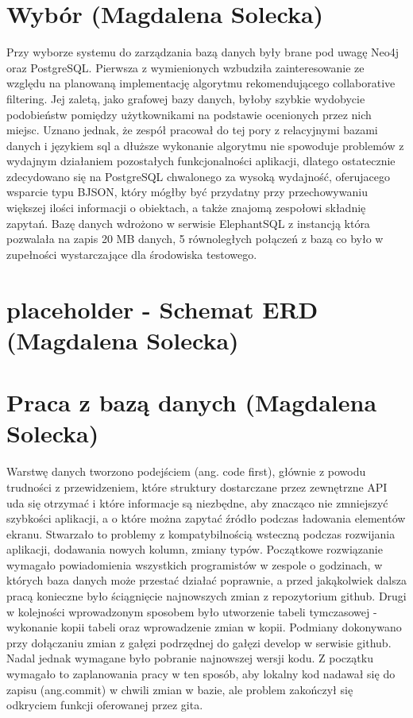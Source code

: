 \documentclass[10pt,twoside,a4paper]{report}
\begin{document}
\section{Wybór (Magdalena Solecka)}
\par Przy wyborze systemu do zarządzania bazą danych były brane pod uwagę Neo4j oraz PostgreSQL. Pierwsza z wymienionych wzbudziła zainteresowanie ze względu na planowaną implementację algorytmu rekomendującego collaborative filtering. Jej zaletą, jako grafowej bazy danych, byłoby szybkie wydobycie podobieństw pomiędzy użytkownikami na podstawie ocenionych przez nich miejsc. Uznano jednak, że zespół pracował do tej pory z relacyjnymi bazami danych i językiem sql a dłuższe wykonanie algorytmu nie spowoduje problemów z wydajnym działaniem pozostałych funkcjonalności aplikacji, dlatego ostatecznie zdecydowano się na PostgreSQL chwalonego za wysoką wydajność, oferujacego wsparcie typu BJSON, który mógłby być przydatny przy  przechowywaniu większej ilości informacji o obiektach, a także znajomą zespołowi składnię zapytań. Bazę danych wdrożono w serwisie ElephantSQL z instancją \cite{tiny turtle}
 która pozwalała na zapis 20 MB danych, 5 równoległych połączeń z bazą co było w zupełności wystarczające dla środowiska testowego.

\section{placeholder - Schemat ERD (Magdalena Solecka)}

\section{Praca z bazą danych (Magdalena Solecka)}
\par Warstwę danych tworzono podejściem \cite{najpierw kod} (ang. code first), głównie z powodu trudności z przewidzeniem, które struktury dostarczane przez zewnętrzne API uda się otrzymać i które informacje są niezbędne, aby znacząco nie zmniejszyć szybkości aplikacji, a o które można zapytać źródło podczas ładowania elementów ekranu. Stwarzało to problemy z kompatybilnością wsteczną podczas rozwijania aplikacji, dodawania nowych kolumn, zmiany typów. Początkowe rozwiązanie wymagało powiadomienia wszystkich programistów w zespole o godzinach, w których baza danych może przestać działać poprawnie, a przed jakąkolwiek dalsza pracą konieczne było ściągnięcie najnowszych zmian z repozytorium github. Drugi w kolejności wprowadzonym sposobem było utworzenie tabeli tymczasowej - wykonanie kopii tabeli oraz wprowadzenie zmian w kopii. Podmiany dokonywano przy dołączaniu zmian z gałęzi podrzędnej do gałęzi develop w serwisie github. Nadal jednak wymagane było pobranie najnowszej wersji kodu. Z początku wymagało to zaplanowania pracy w ten sposób, aby lokalny kod nadawał się do zapisu (ang.commit) w chwili zmian w bazie, ale problem zakończył się odkryciem funkcji \cite{stash/unstash changes} oferowanej przez gita.
\end{document}
